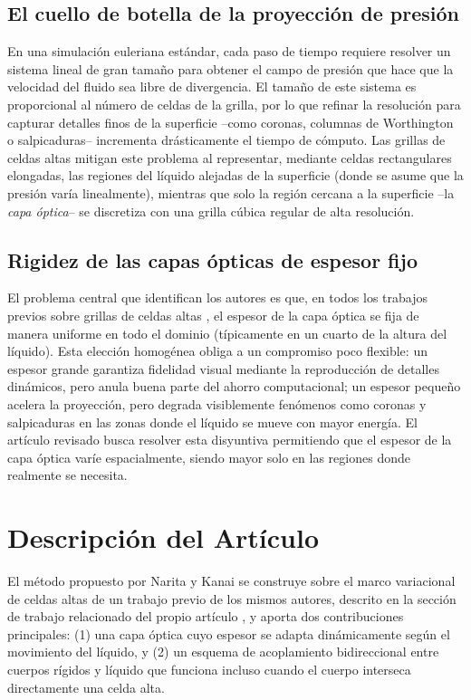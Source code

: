 \documentclass[sigconf,nonacm]{acmart}
\begin{document}
\subsection{El cuello de botella de la proyección de presión}
En una simulación euleriana estándar, cada paso de tiempo requiere resolver un sistema lineal de gran tamaño para obtener el campo de presión que hace que la velocidad del fluido sea libre de divergencia. El tamaño de este sistema es proporcional al número de celdas de la grilla, por lo que refinar la resolución para capturar detalles finos de la superficie --como coronas, columnas de Worthington o salpicaduras-- incrementa drásticamente el tiempo de cómputo. Las grillas de celdas altas mitigan este problema al representar, mediante celdas rectangulares elongadas, las regiones del líquido alejadas de la superficie (donde se asume que la presión varía linealmente), mientras que solo la región cercana a la superficie --la \emph{capa óptica}-- se discretiza con una grilla cúbica regular de alta resolución.

\subsection{Rigidez de las capas ópticas de espesor fijo}
El problema central que identifican los autores es que, en todos los trabajos previos sobre grillas de celdas altas \cite{narita2026}, el espesor de la capa óptica se fija de manera uniforme en todo el dominio (típicamente en un cuarto de la altura del líquido). Esta elección homogénea obliga a un compromiso poco flexible: un espesor grande garantiza fidelidad visual mediante la reproducción de detalles dinámicos, pero anula buena parte del ahorro computacional; un espesor pequeño acelera la proyección, pero degrada visiblemente fenómenos como coronas y salpicaduras en las zonas donde el líquido se mueve con mayor energía. El artículo revisado busca resolver esta disyuntiva permitiendo que el espesor de la capa óptica varíe espacialmente, siendo mayor solo en las regiones donde realmente se necesita.

\section{Descripción del Artículo}
El método propuesto por Narita y Kanai se construye sobre el marco variacional de celdas altas de un trabajo previo de los mismos autores, descrito en la sección de trabajo relacionado del propio artículo \cite{narita2026}, y aporta dos contribuciones principales: (1) una capa óptica cuyo espesor se adapta dinámicamente según el movimiento del líquido, y (2) un esquema de acoplamiento bidireccional entre cuerpos rígidos y líquido que funciona incluso cuando el cuerpo interseca directamente una celda alta.
\end{document}
